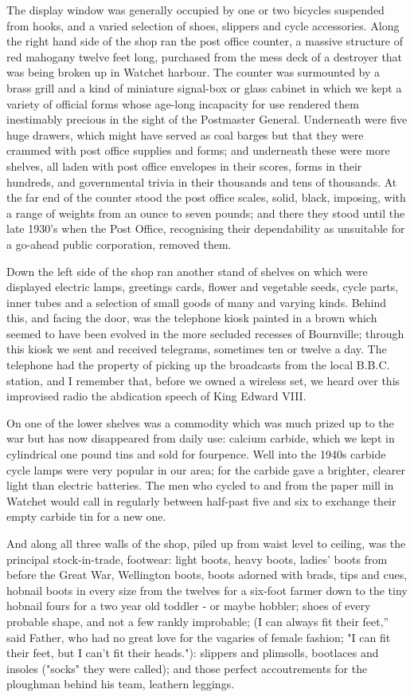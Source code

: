 The display window was generally occupied by one or two bicycles suspended from hooks, and a varied selection of shoes, slippers and cycle accessories. Along the right hand side of the shop ran the post office counter, a massive structure of red mahogany twelve feet long, purchased from the mess deck of a destroyer that was being broken up in Watchet harbour. The counter was surmounted by a brass grill and a kind of miniature signal-box or glass cabinet in which we kept a variety of official forms whose age-long incapacity for use rendered them inestimably precious in the sight of the Postmaster General. Underneath were five huge drawers, which might have served as coal barges but that they were crammed with post office supplies and forms; and underneath these were more shelves, all laden with post office envelopes in their scores, forms in their hundreds, and governmental trivia in their thousands and tens of thousands. At the far end of the counter stood the post office scales, solid, black, imposing, with a range of weights from an ounce to seven pounds; and there they stood until the late 1930’s when the Post Office, recognising their dependability as unsuitable for a go-ahead public corporation, removed them.

Down the left side of the shop ran another stand of shelves on which were displayed electric lamps, greetings cards, flower and vegetable seeds, cycle parts, inner tubes and a selection of small goods of many and varying kinds. Behind this, and facing the door, was the telephone kiosk painted in a brown which seemed to have been evolved in the more secluded recesses of Bournville; through this kiosk we sent and received telegrams, sometimes ten or twelve a day. The telephone had the property of picking up the broadcasts from the local B.B.C. station, and I remember that, before we owned a wireless set, we heard over this improvised radio the abdication speech of King Edward VIII.

On one of the lower shelves was a commodity which was much prized up to the war but has now disappeared from daily use: calcium carbide, which we kept in cylindrical one pound tins and sold for fourpence. Well into the 1940s carbide cycle lamps were very popular in our area; for the carbide gave a brighter, clearer light than electric batteries. The men who cycled to and from the paper mill in Watchet would call in regularly between half-past five and six to exchange their empty carbide tin for a new one.

And along all three walls of the shop, piled up from waist level to ceiling, was the principal stock-in-trade, footwear: light boots, heavy boots, ladies' boots from before the Great War, Wellington boots, boots adorned with brads, tips and cues, hobnail boots in every size from the twelves for a six-foot farmer down to the tiny hobnail fours for a two year old toddler - or maybe hobbler; shoes of every probable shape, and not a few rankly improbable; (I can always fit their feet,” said Father, who had no great love for the vagaries of female fashion; "I can fit their feet, but I can't fit their heads."): slippers and plimsolls, bootlaces and insoles ("socks" they were called); and those perfect accoutrements for the ploughman behind his team, leathern leggings.

